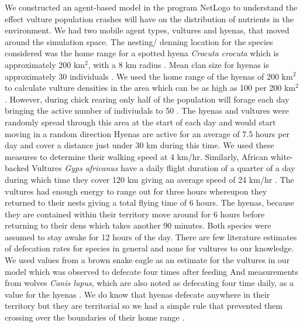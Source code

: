 \documentclass[12pt,letterpaper]{article}
\begin{document}
We constructed an agent-based model in the program NetLogo \cite{tisue2004netlogo} to understand the effect vulture population crashes will have on the distribution of nutrients in the environment. 
We had two mobile agent types, vultures and hyenas, that moved around the simulation space.
The nesting/ denning location for the species considered was the home range for a spotted hyena \textit{Crocuta crocuta} which is approximately 200 km$^2$, with a 8 km radius \cite{holekamp2010intraspecific}. 
Mean clan size for hyenas is approximately 30 individuals \cite{holekamp2010intraspecific}.
We used the home range of the hyenas of 200 km$^2$ to calculate vulture densities in the area which can be as high as 100 per 200 km$^2$. 
However, during chick rearing only half of the population will forage each day bringing the active number of indiviudals to 50 \cite{mundy1992vultures}. 
The hyenas and vultures were randomly spread through this area at the start of each day and would start moving in a random direction \cite{spiegel2013factors}
Hyenas are active for an average of 7.5 hours per day and cover a distance just under 30 km during this time. 
We used these measures to determine their walking speed at 4 km/hr. 
Similarly, African white-backed Vultures \textit{Gyps africanus} have a daily flight duration of a quarter of a day during which time they cover 120 km giving an average speed of 24 km/hr \cite{spiegel2013factors}.
The vultures had enough energy to range out for three hours whereupon they returned to their nests giving a total flying time of 6 hours. 
The hyenas, because they are contained within their territory move around for 6 hours before returning to their dens which takes another 90 minutes. 
Both species were assumed to stay awake for 12 hours of the day. 
There are few literature estimates of defecation rates for species in general and none for vultures to our knowledge. 
We used values from a brown snake eagle as an estimate for the vultures in our model which was observed to defecate four times after feeding \cite{steyn1972further}
And  measurements from wolves \textit{Canis lupus}, which are also noted as defecating four time daily, as a value for the hyenas \cite{marucco2008accuracy}. 
We do know that hyenas defecate anywhere in their territory but they are territorial so we had a simple rule that prevented them crossing over the boundaries of their home range \cite{mills1987scent}. 
\end{document}
